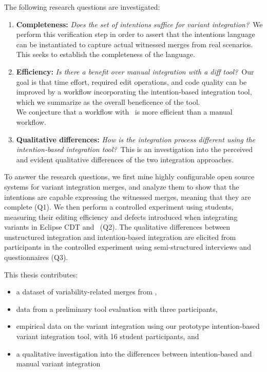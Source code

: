 The following research questions are investigated:

\newcommand{\RQA}{Does the set of intentions suffice for variant integration?}
\newcommand{\RQB}{Is there a benefit over manual integration with a diff tool?}
\newcommand{\RQC}{How is the integration process different using the intention-based integration tool?}

\begin{enumerate}[label={Q\arabic*}]

        \item\label{rq-a} \textbf{Completeness:} \textit{\RQA}~We perform this verification step in order to assert that the intentions language can be instantiated to capture actual witnessed merges from real scenarios. This seeks to establish the completeness of the language.

        \item\label{rq-b} \textbf{Efficiency:} \textit{\RQB}~Our goal is that time effort, required edit operations, and code quality can be improved by a workflow incorporating the intention-based integration tool, which we summarize as the overall beneficence of the tool.\\
        We conjecture that a workflow with \tooln~is more efficient than a manual workflow.
        
        \item\label{rq-c} \textbf{Qualitative differences:} \textit{\RQC}~This is an investigation into the perceived and evident qualitative differences of the two integration approaches.
        
\end{enumerate}

To answer the research questions, we first mine highly configurable open source systems for variant integration merges, and analyze them to show that the intentions are capable expressing the witnessed merges, meaning that they are complete (Q1). We then perform a controlled experiment using students, measuring their editing efficiency and defects introduced when integrating variants in Eclipse CDT and \tooln~(Q2). The qualitative differences between unstructured integration and intention-based integration are elicited from participants in the controlled experiment using semi-structured interviews and questionnaires (Q3).

This thesis contributes:
\begin{itemize}
    \item a dataset of variability-related merges from \marlin,
    \item data from a preliminary tool evaluation with three participants,
    \item empirical data on the variant integration using our prototype intention-based variant integration tool, with 16 student participants, and
    \item a qualitative investigation into the differences between intention-based and manual variant integration
\end{itemize}

